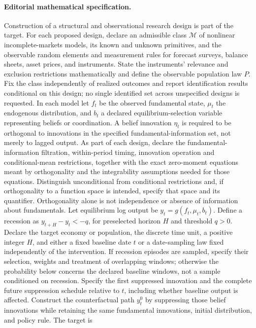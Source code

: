 \documentclass[11pt,a4paper]{article}
\begin{document}
\paragraph{Editorial mathematical specification.} Construction of a structural and observational research design is part of the target. For each proposed design, declare an admissible class \(\mathcal M\) of nonlinear incomplete-markets models, its known and unknown primitives, and the observable random elements and measurement rules for forecast surveys, balance sheets, asset prices, and instruments. State the instruments' relevance and exclusion restrictions mathematically and define the observable population law \(P\). Fix the class independently of realized outcomes and report identification results conditional on this design; no single identified set across unspecified designs is requested. In each model let \(f_t\) be the observed fundamental state, \(\mu_t\) the endogenous distribution, and \(b_t\) a declared equilibrium-selection variable representing beliefs or coordination. A belief innovation \(\eta_t\) is required to be orthogonal to innovations in the specified fundamental-information set, not merely to lagged output. As part of each design, declare the fundamental-information filtration, within-period timing, innovation operation and conditional-mean restrictions, together with the exact zero-moment equations meant by orthogonality and the integrability assumptions needed for those equations. Distinguish unconditional from conditional restrictions and, if orthogonality to a function space is intended, specify that space and its quantifier. Orthogonality alone is not independence or absence of information about fundamentals. Let equilibrium log output be \(y_t=g(f_t,\mu_t,b_t)\). Define a recession as \(y_{t+H}-y_t<-q\), for preselected horizon \(H\) and threshold \(q>0\).
Declare the target economy or population, the discrete time unit, a positive integer \(H\), and either a fixed baseline date \(t\) or a date-sampling law fixed independently of the intervention. If recession episodes are sampled, specify their selection, weights and treatment of overlapping windows; otherwise the probability below concerns the declared baseline windows, not a sample conditioned on recession. Specify the first suppressed innovation and the complete future suppression schedule relative to \(t\), including whether baseline output is affected. Construct the counterfactual path \(y^{0}_t\) by suppressing those belief innovations while retaining the same fundamental innovations, initial distribution, and policy rule. The target is
\end{document}
